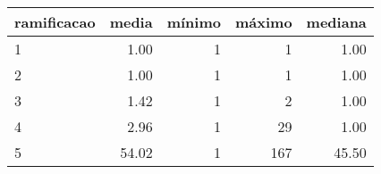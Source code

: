 \begin{table}[ht]
\centering
\begin{tabular}{lrrrr}
  \hline
ramificacao & media & mínimo & máximo & mediana \\ 
  \hline
1 & 1.00 &   1 &   1 & 1.00 \\ 
  2 & 1.00 &   1 &   1 & 1.00 \\ 
  3 & 1.42 &   1 &   2 & 1.00 \\ 
  4 & 2.96 &   1 &  29 & 1.00 \\ 
  5 & 54.02 &   1 & 167 & 45.50 \\ 
   \hline
\end{tabular}
\end{table}
